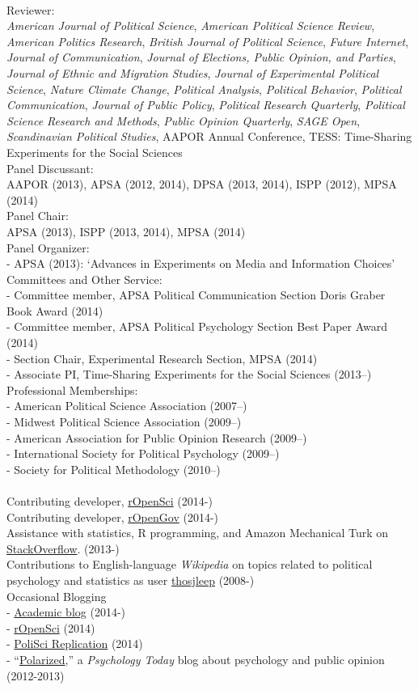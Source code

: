 \documentclass[12pt]{article}
\newcommand{\topic}[1]{\pagebreak[3]\indent {\color{lg}{\footnotesize #1 }}\\}
\newcommand{\entry}[1]{\indent {\color{lg}\guillemotright}\hspace{2pt}#1\vspace{.25em}\\}
\newcommand{\subentry}[1]{{\color{lg}-} #1\vspace{.25em}\\}
\begin{document}
\topic{Disciplinary}
\entry{Reviewer:\\{\em American Journal of Political Science}, {\em American Political Science Review}, {\em American Politics Research}, {\em British Journal of Political Science}, {\em Future Internet}, {\em Journal of Communication}, {\em Journal of Elections, Public Opinion, and Parties}, {\em Journal of Ethnic and Migration Studies}, {\em Journal of Experimental Political Science}, {\em Nature Climate Change}, {\em Political Analysis}, {\em Political Behavior}, {\em Political Communication}, {\em Journal of Public Policy}, {\em Political Research Quarterly}, {\em Political Science Research and Methods}, {\em Public Opinion Quarterly}, {\em SAGE Open}, {\em Scandinavian Political Studies}, AAPOR Annual Conference, TESS: Time-Sharing Experiments for the Social Sciences}
\entry{Panel Discussant:\\AAPOR (2013), APSA (2012, 2014), DPSA (2013, 2014), ISPP (2012), MPSA (2014)}
\entry{Panel Chair:\\APSA (2013), ISPP (2013, 2014), MPSA (2014)}
\entry{Panel Organizer:}
\subentry{APSA (2013): `Advances in Experiments on Media and Information Choices'}
\entry{Committees and Other Service:}
\subentry{Committee member, APSA Political Communication Section Doris Graber Book Award (2014)}
\subentry{Committee member, APSA Political Psychology Section Best Paper Award (2014)}
\subentry{Section Chair, Experimental Research Section, MPSA (2014)}
\subentry{Associate PI, Time-Sharing Experiments for the Social Sciences (2013--)}
\entry{Professional Memberships:}
\subentry{American Political Science Association (2007--)}
\subentry{Midwest Political Science Association (2009--)}
\subentry{American Association for Public Opinion Research (2009--)}
\subentry{International Society for Political Psychology (2009--)}
\subentry{Society for Political Methodology (2010--)}

\topic{Public Engagement}
\entry{Contributing developer, \href{http://ropensci.org/}{rOpenSci} (2014-)}
\entry{Contributing developer, \href{http://ropengov.github.io/}{rOpenGov} (2014-)}
\entry{Assistance with statistics, R programming, and Amazon Mechanical Turk on \href{http://stackoverflow.com/users/2338862/thomas}{StackOverflow}. (2013-)}
\entry{Contributions to English-language {\em Wikipedia} on topics related to political psychology and statistics as user \href{http://en.wikipedia.org/wiki/Special:Contributions/Thosjleep}{thosjleep} (2008-)}
\entry{Occasional Blogging}
\subentry{\href{http://thomasleeper.com/blog}{Academic blog} (2014-)}
\subentry{\href{http://ropensci.org/blog/}{rOpenSci} (2014)}
\subentry{\href{http://politicalsciencereplication.wordpress.com/}{PoliSci Replication} (2014)}
\subentry{``\href{http://www.psychologytoday.com/blog/polarized}{Polarized},'' a {\em Psychology Today} blog about psychology and public opinion (2012-2013)}
\end{document}
